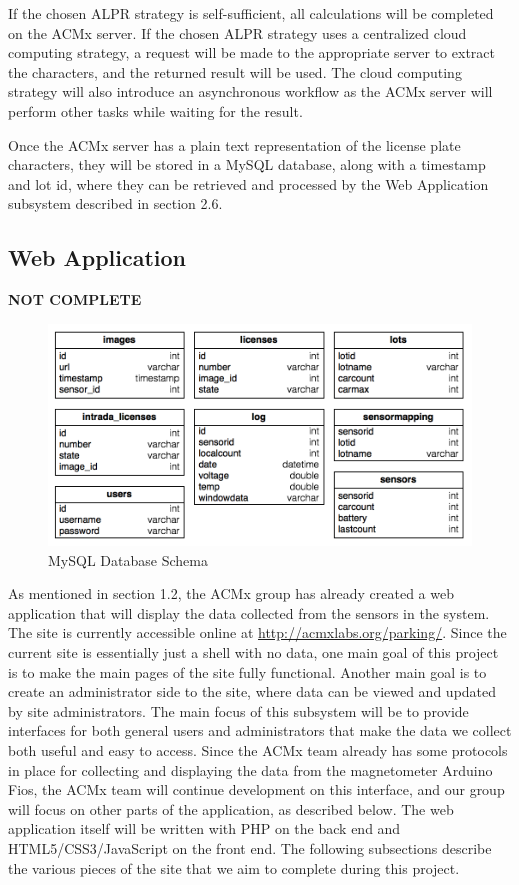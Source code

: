 \documentclass[11pt, oneside, fullpage, doublespace]{article}
\begin{document}
If the chosen ALPR strategy is self-sufficient, all calculations will be completed on the ACMx server. If the chosen ALPR strategy uses a centralized cloud computing strategy, a request will be made to the appropriate server to extract the characters, and the returned result will be used. The cloud computing strategy will also introduce an asynchronous workflow as the ACMx server will perform other tasks while waiting for the result.

Once the ACMx server has a plain text representation of the license plate characters, they will be stored in a MySQL database, along with a timestamp and lot id, where they can be retrieved and processed by the Web Application subsystem described in section 2.6.

\subsection{Web Application}
{\color{red}\textbf{NOT COMPLETE}}
\begin{figure}
\begin{center}
\includegraphics[width=5in]{schema}
\end{center}
\caption{MySQL Database Schema}
\label{fig:schema}
\end{figure}
As mentioned in section 1.2, the ACMx group has already created a web application that will display the data collected from the sensors in the system. The site is currently accessible online at \url{http://acmxlabs.org/parking/}. Since the current site is essentially just a shell with no data, one main goal of this project is to make the main pages of the site fully functional. Another main goal is to create an administrator side to the site, where data can be viewed and updated by site administrators. The main focus of this subsystem will be to provide interfaces for both general users and administrators that make the data we collect both useful and easy to access. Since the ACMx team already has some protocols in place for collecting and displaying the data from the magnetometer Arduino Fios, the ACMx team will continue development on this interface, and our group will focus on other parts of the application, as described below. The web application itself will be written with PHP on the back end and HTML5/CSS3/JavaScript on the front end. The following subsections describe the various pieces of the site that we aim to complete during this project.
\end{document}
